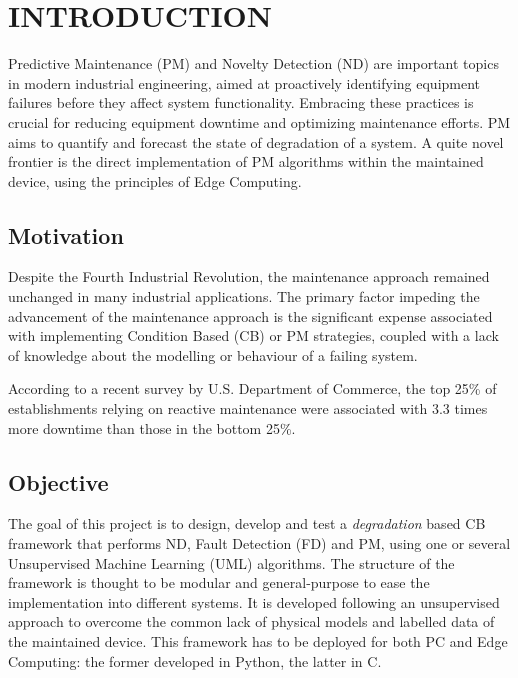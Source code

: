 \section{INTRODUCTION}
\label{sec:introduction}

Predictive Maintenance (PM) and Novelty Detection (ND) are important topics in modern industrial engineering, aimed at proactively identifying equipment failures before they affect system functionality. Embracing these practices is crucial for reducing equipment downtime and optimizing maintenance efforts. PM aims to quantify and forecast the state of degradation of a system. A quite novel frontier is the direct implementation of PM algorithms within the maintained device, using the principles of Edge Computing.

\subsection{Motivation}
Despite the Fourth Industrial Revolution, the maintenance approach remained unchanged in many industrial applications. The primary factor impeding the advancement of the maintenance approach is the significant expense associated with implementing Condition Based (CB) or PM strategies, coupled with a lack of knowledge about the modelling or behaviour of a failing system.

According to a recent survey by U.S. Department of Commerce, the top 25\% of establishments relying on reactive maintenance
were associated with 3.3 times more downtime than those in the bottom 25\%. 

\subsection{Objective}
The goal of this project is to design, develop and test a \emph{degradation} based CB framework
that performs ND, Fault Detection (FD) and PM, using one or several Unsupervised Machine Learning (UML) algorithms. 
The structure of the framework is thought to be modular and general-purpose to ease the implementation into different systems. It is developed following an unsupervised approach to overcome the common lack of physical models and labelled data of the maintained device. This framework has to be deployed for both PC and Edge Computing: the former developed in Python, the latter in C.